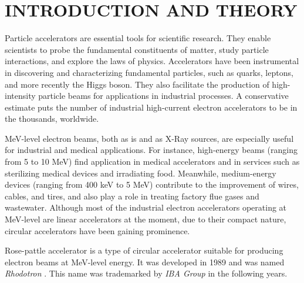\documentclass[a4paper,oneside,12pt]{report}
\numberwithin{equation}{chapter}
\begin{document}
\newcommand{\fromch}[1]{\textit{Chapter \ref{ch:#1}}}

\newcommand{\fromsec}[1]{\textit{Section \ref{sec:#1}}}
\newcommand{\fromsecs}[2]{\textit{Sections \ref{sec:#1} and \ref{sec:#2}}}

\newcommand{\fromapp}[1]{\textit{Appendix \ref{appendix:#1}}}

\newcommand{\fromtab}[1]{\textit{Table \ref{tab:#1}}}
\newcommand{\fromtabs}[2]{\textit{Tables \ref{tab:#1} and \ref{tab:#2}}}
\newcommand{\fromtabf}[4]{\textit{Tables \ref{tab:#1}, \ref{tab:#2}, \ref{tab:#3} and \ref{tab:#4}}}



\chapter{INTRODUCTION AND THEORY}

Particle accelerators are essential tools for scientific research. They enable scientists to probe the fundamental constituents of matter, study particle interactions, and explore the laws of physics. 
Accelerators have been instrumental in discovering and characterizing fundamental particles, such as quarks, leptons, and more recently the Higgs boson. 
They also facilitate the production of high-intensity particle beams for applications in industrial processes. A conservative estimate puts the number of industrial high-current electron
accelerators to be in the thousands, worldwide.

MeV-level electron beams, both as is and as X-Ray sources, are especially useful for industrial and medical applications. 
For instance,  high-energy beams (ranging from 5 to 10 MeV) find application in medical accelerators and in services such as sterilizing medical devices and irradiating food. 
Meanwhile, medium-energy devices (ranging from 400 keV to 5 MeV) contribute to the improvement of wires, cables, and tires, and also play a role in treating factory flue gases and wastewater.
Although most of the industrial electron accelerators operating at MeV-level are linear accelerators at the moment, due to their compact nature, circular accelerators have been gaining prominence. 

Rose-pattle accelerator is a type of circular accelerator suitable for producing electron beams at MeV-level energy. 
It was developed in 1989 and was named \textit{Rhodotron} \cite{rhodo_pottier}. This name was trademarked by \textit{IBA Group} in the following years. 
\end{document}
